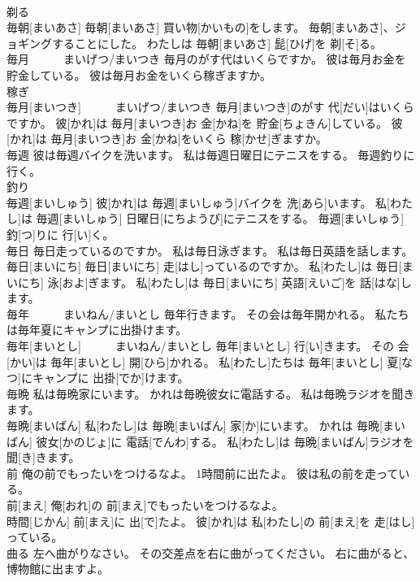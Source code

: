 \documentclass[8pt]{extreport}
\begin{document}
\begin{CJK}{UTF8}{min}
\\	剃る 
\\	毎朝[まいあさ] 毎朝[まいあさ] 買い物[かいもの]をします。 毎朝[まいあさ]、ジョギングすることにした。 わたしは 毎朝[まいあさ] 髭[ひげ]を 剃[そ]る。
\\	毎月　　　まいげつ/まいつき 毎月のがす代はいくらですか。 彼は毎月お金を貯金している。 彼は毎月お金をいくら稼ぎますか。	
\\	稼ぎ 
\\	毎月[まいつき]　　　まいげつ/まいつき 毎月[まいつき]のがす 代[だい]はいくらですか。 彼[かれ]は 毎月[まいつき]お 金[かね]を 貯金[ちょきん]している。 彼[かれ]は 毎月[まいつき]お 金[かね]をいくら 稼[かせ]ぎますか。
\\	毎週 彼は毎週バイクを洗います。 私は毎週日曜日にテニスをする。 毎週釣りに行く。	
\\	釣り 
\\	毎週[まいしゅう] 彼[かれ]は 毎週[まいしゅう]バイクを 洗[あら]います。 私[わたし]は 毎週[まいしゅう] 日曜日[にちようび]にテニスをする。 毎週[まいしゅう] 釣[つ]りに 行[い]く。
\\	毎日 毎日走っているのですか。 私は毎日泳ぎます。 私は毎日英語を話します。	
\\	毎日[まいにち] 毎日[まいにち] 走[はし]っているのですか。 私[わたし]は 毎日[まいにち] 泳[およ]ぎます。 私[わたし]は 毎日[まいにち] 英語[えいご]を 話[はな]します。
\\	毎年　　　まいねん/まいとし 毎年行きます。 その会は毎年開かれる。 私たちは毎年夏にキャンプに出掛けます。	
\\	毎年[まいとし]　　　まいねん/まいとし 毎年[まいとし] 行[い]きます。 その 会[かい]は 毎年[まいとし] 開[ひら]かれる。 私[わたし]たちは 毎年[まいとし] 夏[なつ]にキャンプに 出掛[でか]けます。
\\	毎晩 私は毎晩家にいます。 かれは毎晩彼女に電話する。 私は毎晩ラジオを聞きます。	
\\	毎晩[まいばん] 私[わたし]は 毎晩[まいばん] 家[か]にいます。 かれは 毎晩[まいばん] 彼女[かのじょ]に 電話[でんわ]する。 私[わたし]は 毎晩[まいばん]ラジオを 聞[き]きます。
\\	前 俺の前でもったいをつけるなよ。 1時間前に出たよ。 彼は私の前を走っている。	
\\	前[まえ] 俺[おれ]の 前[まえ]でもったいをつけるなよ。 
\\	時間[じかん] 前[まえ]に 出[で]たよ。 彼[かれ]は 私[わたし]の 前[まえ]を 走[はし]っている。
\\	曲る 左へ曲がりなさい。 その交差点を右に曲がってください。 右に曲がると、博物館に出ますよ。	

\end{CJK}
\end{document}

